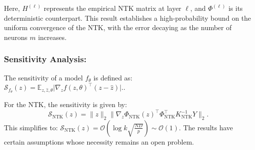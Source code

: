 	Here, \( H^{(\ell)} \) represents the empirical NTK matrix at layer \(\ell\), and \( \Phi^{(\ell)} \) is its deterministic counterpart. This result establishes a high-probability bound on the uniform convergence of the NTK, with the error decaying as the number of neurons \( m \) increases.
	
\subsubsection{Sensitivity Analysis:}
The sensitivity of a model \(f_\theta\) is defined as:
\(
\mathcal{S}_{f_\theta}(z) = \mathbb{E}_{z, \hat{z}, \theta} \big| \nabla_z f(z, \theta)^\top (z - \hat{z}) \big|.
\).

For the NTK, the sensitivity is given by:~\cite{pmlr-v202-bombari23a}
\[
\mathcal{S}_{\text{NTK}}(z) = \|z\|_2 \big\| \nabla_z \Phi_{\text{NTK}}(z)^\top \Phi_{\text{NTK}}^\top K_{\text{NTK}}^{-1} Y \big\|_2.
\]
This simplifies to:
\(
\mathcal{S}_{\text{NTK}}(z) = \mathcal{O}\left(\log k \sqrt{\frac{ND}{p}}\right) \sim \mathcal{O}(1)
\). The results have certain assumptions whose necessity remains an open problem.

%
%
%

